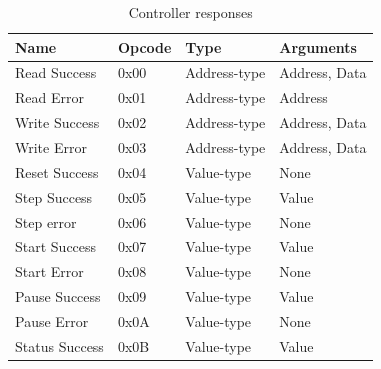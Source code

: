 \documentclass[main.tex]{subfiles}
\begin{document}
\begin{table}[h]
    \footnotesize       
    \caption{Controller responses}
    \label{tbl:opcodes-res}
    \centering
    \begin{tabular}{|l|l|l|l|}
        \hline
        \textbf{Name}  & \textbf{Opcode} & \textbf{Type}  & \textbf{Arguments}  \\ \hline
        Read Success   & 0x00            & Address-type   & Address, Data       \\
        Read Error     & 0x01            & Address-type   & Address             \\
        Write Success  & 0x02            & Address-type   & Address, Data       \\
        Write Error    & 0x03            & Address-type   & Address, Data       \\
        Reset Success  & 0x04            & Value-type     & None                \\
        Step Success   & 0x05            & Value-type     & Value               \\
        Step error     & 0x06            & Value-type     & None                \\
        Start Success  & 0x07            & Value-type     & Value               \\
        Start Error    & 0x08            & Value-type     & None                \\
        Pause Success  & 0x09            & Value-type     & Value               \\
        Pause Error    & 0x0A            & Value-type     & None                \\
        Status Success & 0x0B            & Value-type     & Value               \\ \hline
    \end{tabular}
\end{table}


\end{document}
